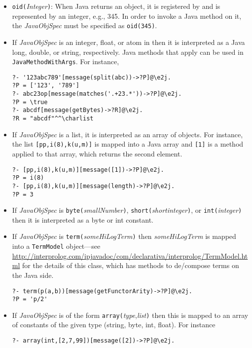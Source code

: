 \begin{itemize}
\item  \texttt{oid(}\emph{Integer}\texttt{)}: When Java returns an object,
  it is registered by \FLSYSTEM and is represented by an integer, e.g.,
  345. In order to 
  invoke a Java method on it, the \emph{JavaObjSpec} must be specified as
  \texttt{oid(345)}.
\item If \emph{JavaObjSpec} is an integer, float, or atom in \ERGO then
  it is interpreted as a Java long, double, or string, respectively. Java
  methods that apply can be used in \texttt{JavaMethodWithArgs}. For instance,
\begin{verbatim}
?- '123abc789'[message(split(abc))->?P]@\e2j.
?P = ['123', '789']
?- abc23op[message(matches('.+23.*'))->?P]@\e2j.
?P = \true
?- abcdf[message(getBytes)->?R]@\e2j.
?R = "abcdf"^^\charlist
\end{verbatim}
\item If \emph{JavaObjSpec} is a list, it is interpreted as an array of
  objects. For instance, the list \texttt{[pp,i(8),k(u,m)]} is mapped into
  a Java array and \texttt{[1]} is a method applied to that array, which
  returns the second element.  
\begin{verbatim}
?- [pp,i(8),k(u,m)][message([1])->?P]@\e2j.
?P = i(8)  
?- [pp,i(8),k(u,m)][message(length)->?P]@\e2j.
?P = 3
\end{verbatim}
\item If \emph{JavaObjSpec} is \texttt{byte(}\emph{smallNumber}\texttt{)},
  \texttt{short(}\emph{shortinteger}\texttt{)},
  or \texttt{int(}\emph{integer}\texttt{)}
  then it is interpreted as a byte or int constant.
\item If \emph{JavaObjSpec} is \texttt{term(}\emph{someHiLogTerm}\texttt{)} 
  then \emph{someHiLogTerm} is mapped into a \texttt{TermModel} object---see
  \url{http://interprolog.com/ipjavadoc/com/declarativa/interprolog/TermModel.html}
  for the details of this class, which has methods to de/compose terms on
  the Java side.
\begin{verbatim}
?- term(p(a,b))[message(getFunctorArity)->?P]@\e2j.
?P = 'p/2'
\end{verbatim}
\item If \emph{JavaObjSpec} is of the form
  \texttt{array(}\emph{type},\emph{list}\texttt{)} then this is mapped to
  an array of constants of the given type (string, byte, int, float). For
  instance
\begin{verbatim}
?- array(int,[2,7,99])[message([2])->?P]@\e2j.

\end{verbatim}
\end{itemize}
